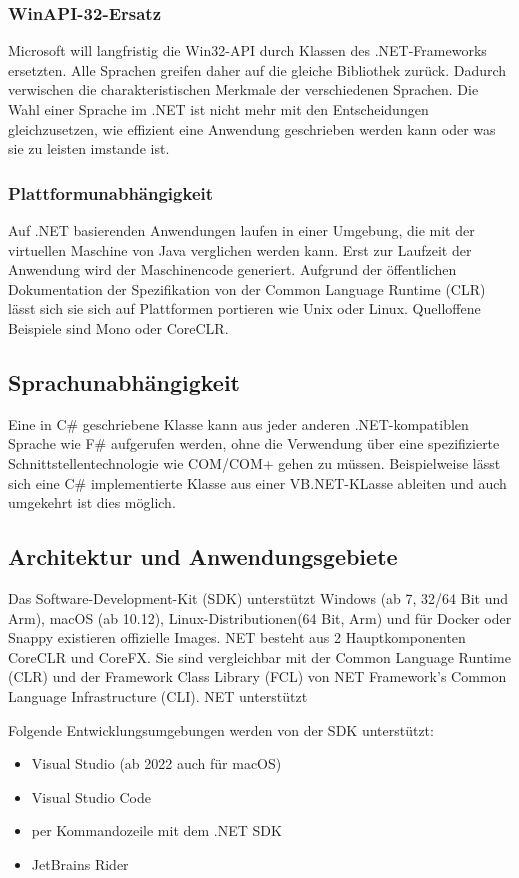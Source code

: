 \subsubsection{WinAPI-32-Ersatz}
Microsoft will langfristig die Win32-API durch Klassen des .NET-Frameworks ersetzten. Alle Sprachen greifen 
daher auf die gleiche Bibliothek zurück. Dadurch verwischen die charakteristischen Merkmale der verschiedenen Sprachen. 
Die Wahl einer Sprache im .NET ist nicht mehr mit den Entscheidungen gleichzusetzen, wie effizient eine Anwendung geschrieben werden kann 
oder was sie zu leisten imstande ist.

\subsubsection{Plattformunabhängigkeit}
Auf .NET basierenden Anwendungen laufen in einer Umgebung, die mit der virtuellen Maschine von Java verglichen werden kann.
Erst zur Laufzeit der Anwendung wird der Maschinencode generiert. Aufgrund der öffentlichen Dokumentation der Spezifikation von 
der Common Language Runtime (CLR) lässt sich sie sich auf Plattformen portieren wie Unix oder Linux. 
Quelloffene Beispiele sind Mono oder CoreCLR.

\subsection{Sprachunabhängigkeit}
Eine in C\# geschriebene Klasse kann aus jeder anderen .NET-kompatiblen Sprache wie F\# aufgerufen werden, ohne die Verwendung über eine 
spezifizierte Schnittstellentechnologie wie COM/COM+ gehen zu müssen. Beispielweise lässt sich eine C\# implementierte Klasse aus einer 
VB.NET-KLasse ableiten und auch umgekehrt ist dies möglich.

\subsection{Architektur und Anwendungsgebiete}
Das Software-Development-Kit (SDK) unterstützt Windows (ab 7, 32/64 Bit und Arm), macOS (ab 10.12), Linux-Distributionen(64 Bit, Arm) 
und für Docker oder Snappy existieren offizielle Images. NET besteht aus 2 Hauptkomponenten CoreCLR und CoreFX. 
Sie sind vergleichbar mit der Common Language Runtime (CLR) und der  Framework Class Library (FCL) 
von NET Framework's Common Language Infrastructure (CLI). NET unterstützt

Folgende Entwicklungsumgebungen werden von der SDK unterstützt:
\begin{itemize}
    \item Visual Studio (ab 2022 auch für macOS)
    \item Visual Studio Code
    \item per Kommandozeile mit dem .NET SDK
    \item JetBrains Rider 
\end{itemize}

